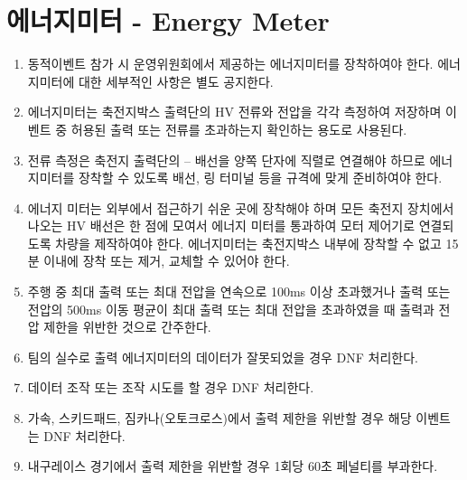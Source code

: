 \documentclass[final,a4paper,10pt]{report}
\begin{document}
\section{에너지미터 - Energy Meter}\label{rule:formula-technical.energy-meter}
\begin{enumerate}
  \item\label{rule:formula-technical.energy-meter.provided-for-dynamic-events} 동적이벤트 참가 시 운영위원회에서 제공하는 에너지미터를 장착하여야 한다. 에너지미터에 대한 세부적인 사항은 별도 공지한다.
  \item\label{rule:formula-technical.energy-meter.measures-hv-current-voltage} 에너지미터는 축전지박스 출력단의 HV 전류와 전압을 각각 측정하여 저장하며 이벤트 중 허용된 출력 또는 전류를 초과하는지 확인하는 용도로 사용된다.
  \item\label{rule:formula-technical.energy-meter.current-sensor-wiring-prep} 전류 측정은 축전지 출력단의 – 배선을 양쪽 단자에 직렬로 연결해야 하므로 에너지미터를 장착할 수 있도록 배선, 링 터미널 등을 규격에 맞게 준비하여야 한다.
  \item\label{rule:formula-technical.energy-meter.outside-accumulator-15min-swap} 에너지 미터는 외부에서 접근하기 쉬운 곳에 장착해야 하며 모든 축전지 장치에서 나오는 HV 배선은 한 점에 모여서 에너지 미터를 통과하여 모터 {\color{blue}제어기}로 연결되도록 차량을 제작하여야 한다. 에너지미터는 축전지박스 내부에 장착할 수 없고 15분 이내에 장착 또는 제거, 교체할 수 있어야 한다.
  \item\label{rule:formula-technical.energy-meter.power-limit-violation-criteria} 주행 중 최대 출력 또는 최대 전압을 연속으로 100ms 이상 초과했거나 출력 또는 전압의 500ms 이동 평균이 최대 출력 또는 최대 전압을 초과하였을 때 출력과 전압 제한을 위반한 것으로 간주한다. \label{item:출력 제한 위반}
  \item\label{rule:formula-technical.energy-meter.erroneous-data-dnf} 팀의 실수로 출력 에너지미터의 데이터가 잘못되었을 경우 DNF 처리한다.
  \item\label{rule:formula-technical.energy-meter.data-tampering-dnf} 데이터 조작 또는 조작 시도를 할 경우 DNF 처리한다.
  \item\label{rule:formula-technical.energy-meter.accel-skidpad-autocross-dnf} 가속, 스키드패드, 짐카나(오토크로스)에서 출력 제한을 위반할 경우 해당 이벤트는 DNF 처리한다.
  \item\label{rule:formula-technical.energy-meter.endurance-60s-penalty} 내구레이스 경기에서 출력 제한을 위반할 경우 1회당 60초 페널티를 부과한다.

\end{enumerate}
\end{document}
